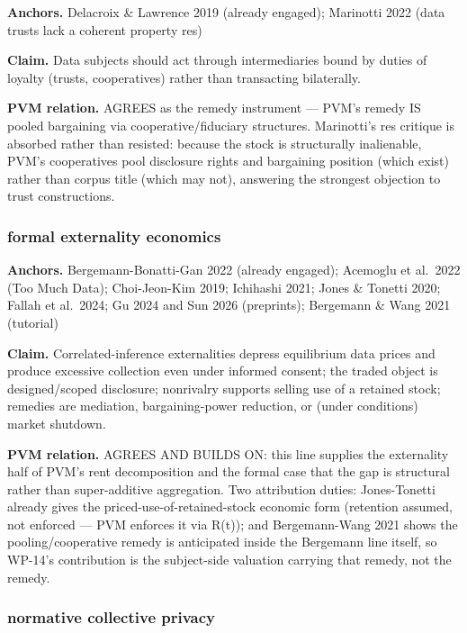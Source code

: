 \documentclass[
  11pt,
]{article}
\begin{document}
\textbf{Anchors.} Delacroix \& Lawrence 2019 (already engaged);
Marinotti 2022 (data trusts lack a coherent property res)

\textbf{Claim.} Data subjects should act through intermediaries bound by
duties of loyalty (trusts, cooperatives) rather than transacting
bilaterally.

\textbf{PVM relation.} AGREES as the remedy instrument --- PVM's remedy
IS pooled bargaining via cooperative/fiduciary structures. Marinotti's
res critique is absorbed rather than resisted: because the stock is
structurally inalienable, PVM's cooperatives pool disclosure rights and
bargaining position (which exist) rather than corpus title (which may
not), answering the strongest objection to trust constructions.

\subsubsection{formal externality
economics}\label{formal-externality-economics}

\textbf{Anchors.} Bergemann-Bonatti-Gan 2022 (already engaged); Acemoglu
et al.~2022 (Too Much Data); Choi-Jeon-Kim 2019; Ichihashi 2021; Jones
\& Tonetti 2020; Fallah et al.~2024; Gu 2024 and Sun 2026 (preprints);
Bergemann \& Wang 2021 (tutorial)

\textbf{Claim.} Correlated-inference externalities depress equilibrium
data prices and produce excessive collection even under informed
consent; the traded object is designed/scoped disclosure; nonrivalry
supports selling use of a retained stock; remedies are mediation,
bargaining-power reduction, or (under conditions) market shutdown.

\textbf{PVM relation.} AGREES AND BUILDS ON: this line supplies the
externality half of PVM's rent decomposition and the formal case that
the gap is structural rather than super-additive aggregation. Two
attribution duties: Jones-Tonetti already gives the
priced-use-of-retained-stock economic form (retention assumed, not
enforced --- PVM enforces it via R(t)); and Bergemann-Wang 2021 shows
the pooling/cooperative remedy is anticipated inside the Bergemann line
itself, so WP-14's contribution is the subject-side valuation carrying
that remedy, not the remedy.

\subsubsection{normative collective
privacy}\label{normative-collective-privacy}
\end{document}
